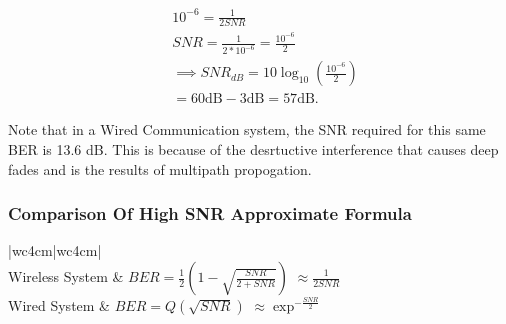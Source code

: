                \begin{center}
               \begin{align}
                  &10^{-6}=\frac{1}{2SNR} \\[10pt]
                  &SNR=\frac{1}{2*10^{-6}} = \frac{10^{-6}}{2} \\[10pt]
                  &\implies SNR_{dB}
                  =10\log_{10}\left(\frac{10^{-6}}{2}\right)\\[10pt]
                  &=60\text{dB}-3\text{dB}=57\text{dB}.
               \end{align}
               \end{center}

               Note that in a Wired Communication system, the SNR required for
               this same BER is 13.6 dB.  This is because of the desrtuctive
               interference that causes deep fades and is the results of
               multipath propogation.

               \subsubsection{Comparison Of High SNR Approximate Formula}

               \begin{table}[htpb]
               \begin{center}
               \caption{Comparison of high SNR approximate BER formula for
               Wired and Wireless Systems}
               \label{tab:Comparison of high SNR approximate BER formula for
               Wired and Wireless Systems}
               \begin{tabular}[c]{|w{c}{4cm}|w{c}{4cm}|}
                  \hline
                   \\
                  \hline
                  Wireless System &
                  $BER=\frac{1}{2}\left(1-\sqrt{\frac{SNR}{2+SNR}}\right)$
                  $\approx \frac{1}{2SNR}$ \\
                  \hline
                  Wired System &
                  $BER=Q\left(\sqrt{SNR}\right)$
                  $\approx \exp^{-\frac{SNR}{2}} $\\
                  \hline
               \end{tabular}
               \end{center}
               \end{table}

